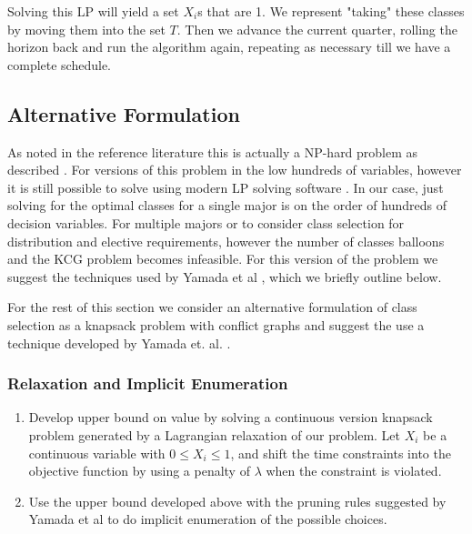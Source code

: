 \documentclass[11pt]{article} %
\begin{document}
Solving this LP will yield a set $X_i$s that are 1.  We represent "taking" these
classes by moving them into the set $T$.  Then we advance the current quarter,
rolling the horizon back and run the algorithm again, repeating as necessary
till we have a complete schedule.

\subsection{Alternative Formulation} As noted in the reference literature this
is actually a NP-hard problem as described \cite{pferschy:kcg}.  For versions of
this problem in the low hundreds of variables, however it is still possible to
solve using modern LP solving software \cite{yamada:heuristic}.  In our case,
just solving for the optimal classes for a single major is on the order of
hundreds of decision variables.  For multiple majors or to
consider class selection for distribution and elective requirements, however the
number of classes balloons and the KCG problem becomes infeasible.
For this version of the problem we suggest the techniques used by Yamada
et al \cite{yamada:heuristic}, which we briefly outline below.

For the rest of this section we consider an alternative formulation of class
selection as a knapsack problem with conflict graphs and suggest the use
a technique developed by Yamada et. al. \cite{yamada:heuristic}.

\subsubsection{Relaxation and Implicit Enumeration} \begin{enumerate} \item
Develop upper bound on value by solving a continuous version knapsack problem
generated by a Lagrangian relaxation of our problem.  Let $X_i$ be a continuous
variable with $0 \leq X_i \leq 1$, and shift the time constraints into the
objective function by using a penalty of $\lambda$ when the constraint is
violated.  \item Use the upper bound developed above with the pruning rules
suggested by Yamada et al \cite{yamada:heuristic} to do implicit enumeration of
the possible choices.  \end{enumerate}
\end{document}
